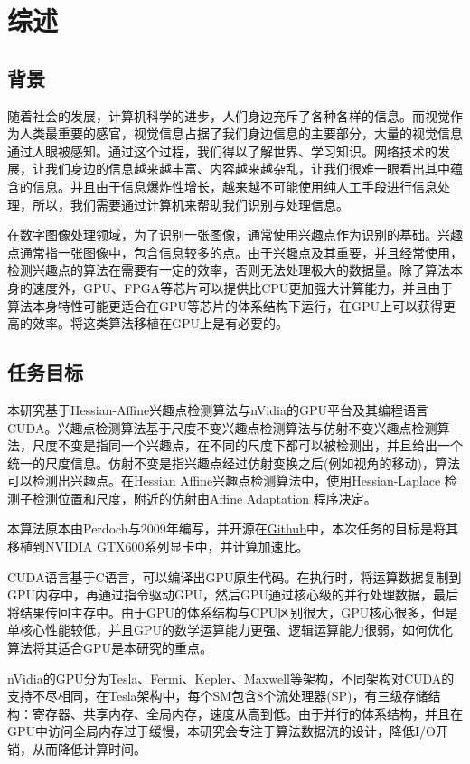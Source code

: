 
\chapter{综述}
\label{chap:intro}

  \section{背景}
  \label{sec:background}
    随着社会的发展，计算机科学的进步，人们身边充斥了各种各样的信息。而视觉作为人类最重要的感官，视觉信息占据了我们身边信息的主要部分，大量的视觉信息通过人眼被感知。通过这个过程，我们得以了解世界、学习知识。网络技术的发展，让我们身边的信息越来越丰富、内容越来越杂乱，让我们很难一眼看出其中蕴含的信息。并且由于信息爆炸性增长，越来越不可能使用纯人工手段进行信息处理，所以，我们需要通过计算机来帮助我们识别与处理信息。
    \par
    在数字图像处理领域，为了识别一张图像，通常使用兴趣点作为识别的基础。兴趣点通常指一张图像中，包含信息较多的点。由于兴趣点及其重要，并且经常使用，检测兴趣点的算法在需要有一定的效率，否则无法处理极大的数据量。除了算法本身的速度外，GPU、FPGA等芯片可以提供比CPU更加强大计算能力，并且由于算法本身特性可能更适合在GPU等芯片的体系结构下运行，在GPU上可以获得更高的效率。将这类算法移植在GPU上是有必要的。

  \section{任务目标}
  \label{sec:aim}
    本研究基于Hessian-Affine兴趣点检测算法与nVidia的GPU平台及其编程语言CUDA。兴趣点检测算法基于尺度不变兴趣点检测算法与仿射不变兴趣点检测算法，尺度不变是指同一个兴趣点，在不同的尺度下都可以被检测出，并且给出一个统一的尺度信息。仿射不变是指兴趣点经过仿射变换之后(例如视角的移动)，算法可以检测出兴趣点。在Hessian Affine兴趣点检测算法中，使用Hessian-Laplace 检测子检测位置和尺度，附近的仿射由Affine Adaptation 程序决定。
    \par
    本算法原本由Perdoch与2009年编写，并开源在\href{https://github.com/perdoch/hesaff}{Github}中，本次任务的目标是将其移植到NVIDIA GTX600系列显卡中，并计算加速比。
    \par
    CUDA语言基于C语言，可以编译出GPU原生代码。在执行时，将运算数据复制到GPU内存中，再通过指令驱动GPU，然后GPU通过核心级的并行处理数据，最后将结果传回主存中。由于GPU的体系结构与CPU区别很大，GPU核心很多，但是单核心性能较低，并且GPU的数学运算能力更强、逻辑运算能力很弱，如何优化算法将其适合GPU是本研究的重点。
    \par
    nVidia的GPU分为Tesla、Fermi、Kepler、Maxwell等架构，不同架构对CUDA的支持不尽相同，在Tesla架构中，每个SM包含8个流处理器(SP)，有三级存储结构：寄存器、共享内存、全局内存，速度从高到低。由于并行的体系结构，并且在GPU中访问全局内存过于缓慢，本研究会专注于算法数据流的设计，降低I/O开销，从而降低计算时间。
